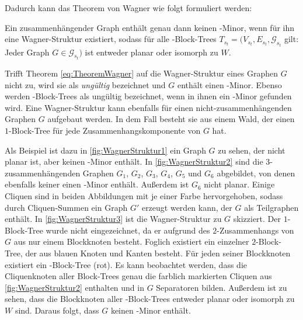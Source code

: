 Dadurch kann das Theorem von Wagner wie folgt formuliert werden:

\begin{theorem}\label{eq:TheoremWagner}
  Ein zusammenhängender Graph enthält genau dann keinen \kf-Minor, wenn für ihn eine Wagner-Struktur existiert, sodass für alle \dd-Block-Trees $T_{s_t} = (V_{s_t}, E_{s_t}, \mathcal{G}_{s_t}$ gilt: Jeder Graph $G \in \mathcal{G}_{s_t})$ ist entweder planar oder isomorph zu $W$.
\end{theorem}

Trifft Theorem \ref{eq:TheoremWagner} auf die Wagner-Struktur eines Graphen $G$ nicht zu, wird sie als \emph{ungültig} bezeichnet und $G$ enthält einen \kf-Minor.
Ebenso werden \dd-Block-Trees als ungültig bezeichnet, wenn in ihnen ein \kf-Minor gefunden wird.
Eine Wagner-Struktur kann ebenfalls für einen nicht-zusammenhängenden Graphen $G$ aufgebaut werden.
In dem Fall besteht sie aus einem Wald, der einen $1$-Block-Tree für jede Zusammenhangskomponente von $G$ hat.

Als Beispiel ist dazu in \Abb \ref{fig:WagnerStruktur1} ein Graph $G$ zu sehen, der nicht planar ist, aber keinen \kf-Minor enthält.
In \Abb \ref{fig:WagnerStruktur2} sind die $3$-zusammenhängenden Graphen $G_1$, $G_2$, $G_3$, $G_4$, $G_5$ und $G_6$ abgebildet, von denen ebenfalls keiner einen \kf-Minor enthält.
Außerdem ist $G_6$ nicht planar.
Einige Cliquen sind in beiden Abbildungen mit je einer Farbe hervorgehoben, sodass durch Cliquen-Summen ein Graph $G'$ erzeugt werden kann, der $G$ als Teilgraphen enthält.
In \Abb \ref{fig:WagnerStruktur3} ist die Wagner-Struktur zu $G$ skizziert.
Der $1$-Block-Tree wurde nicht eingezeichnet, da er aufgrund des $2$-Zusammenhangs von $G$ aus nur einem Blockknoten besteht.
Foglich existiert ein einzelner $2$-Block-Tree, der aus blauen Knoten und Kanten besteht.
Für jeden seiner Blockknoten existiert ein \dd-Block-Tree (rot).
Es kann beobachtet werden, dass die Cliquenknoten aller Block-Trees genau die farblich markierten Cliquen aus \Abb \ref{fig:WagnerStruktur2} enthalten und in $G$ Separatoren bilden.
Außerdem ist zu sehen, dass die Blockknoten aller \dd-Block-Trees entweder planar oder isomorph zu $W$ sind.
Daraus folgt, dass $G$ keinen \kf-Minor enthält.

